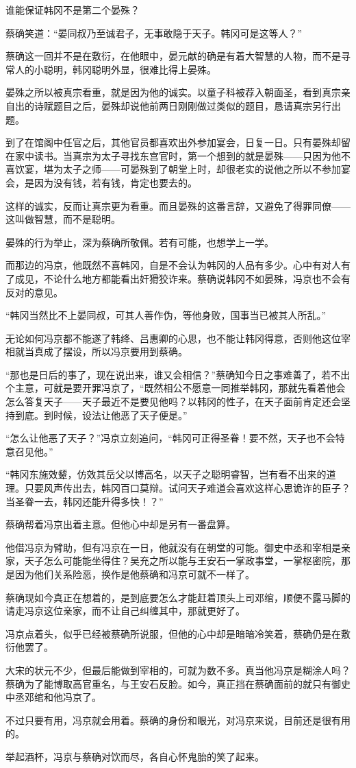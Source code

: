 谁能保证韩冈不是第二个晏殊？

蔡确笑道：“晏同叔乃至诚君子，无事敢隐于天子。韩冈可是这等人？”

蔡确这一回并不是在敷衍，在他眼中，晏元献的确是有着大智慧的人物，而不是寻常人的小聪明，韩冈聪明外显，很难比得上晏殊。

晏殊之所以被真宗看重，就是因为他的诚实。以童子科被荐入朝面圣，看到真宗亲自出的诗赋题目之后，晏殊却说他前两日刚刚做过类似的题目，恳请真宗另行出题。

到了在馆阁中任官之后，其他官员都喜欢出外参加宴会，日复一日。只有晏殊却留在家中读书。当真宗为太子寻找东宫官时，第一个想到的就是晏殊——只因为他不喜饮宴，堪为太子之师——可晏殊到了朝堂上时，却很老实的说他之所以不参加宴会，是因为没有钱，若有钱，肯定也要去的。

这样的诚实，反而让真宗更为看重。而且晏殊的这番言辞，又避免了得罪同僚——这叫做智慧，而不是聪明。

晏殊的行为举止，深为蔡确所敬佩。若有可能，也想学上一学。

而那边的冯京，他既然不喜韩冈，自是不会认为韩冈的人品有多少。心中有对人有了成见，不论什么地方都能看出奸猾狡诈来。蔡确说韩冈不如晏殊，冯京也不会有反对的意见。

“韩冈当然比不上晏同叔，可其人善作伪，等他身败，国事当已被其人所乱。”

无论如何冯京都不能遂了韩绛、吕惠卿的心思，也不能让韩冈得意，否则他这位宰相就当真成了摆设，所以冯京要用到蔡确。

“那也是日后的事了，现在说出来，谁又会相信？”蔡确知今日之事难善了，若不出个主意，可就是要开罪冯京了，“既然相公不愿意一同推举韩冈，那就先看着他会怎么答复天子——天子最近不是要见他吗？以韩冈的性子，在天子面前肯定还会坚持到底。到时候，设法让他恶了天子便是。”

“怎么让他恶了天子？”冯京立刻追问，“韩冈可正得圣眷！要不然，天子也不会特意召见他。”

“韩冈东施效颦，仿效其岳父以博高名，以天子之聪明睿智，岂有看不出来的道理。只要风声传出去，韩冈百口莫辩。试问天子难道会喜欢这样心思诡诈的臣子？当圣眷一去，韩冈还能升得多快！？”

蔡确帮着冯京出着主意。但他心中却是另有一番盘算。

他借冯京为臂助，但有冯京在一日，他就没有在朝堂的可能。御史中丞和宰相是亲家，天子怎么可能能坐得住？吴充之所以能与王安石一掌政事堂，一掌枢密院，那是因为他们关系险恶，换作是他蔡确和冯京可就不一样了。

蔡确现如今真正在想着的，是到底要怎么才能赶着顶头上司邓绾，顺便不露马脚的请走冯京这位亲家，而不让自己纠缠其中，那就更好了。

冯京点着头，似乎已经被蔡确所说服，但他的心中却是暗暗冷笑着，蔡确仍是在敷衍他罢了。

大宋的状元不少，但最后能做到宰相的，可就为数不多。真当他冯京是糊涂人吗？蔡确为了能博取高官重名，与王安石反脸。如今，真正挡在蔡确面前的就只有御史中丞邓绾和他冯京了。

不过只要有用，冯京就会用着。蔡确的身份和眼光，对冯京来说，目前还是很有用的。

举起酒杯，冯京与蔡确对饮而尽，各自心怀鬼胎的笑了起来。


